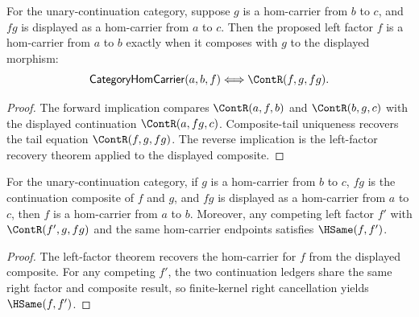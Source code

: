 \begin{theorem}
\label{thm:category-hom-carrier-comp-left-factor-iff}
For the unary-continuation category, suppose \(g\) is a hom-carrier from \(b\)
to \(c\), and \(fg\) is displayed as a hom-carrier from \(a\) to \(c\). Then
the proposed left factor \(f\) is a hom-carrier from \(a\) to \(b\) exactly
when it composes with \(g\) to the displayed morphism:
$$
\mathsf{CategoryHomCarrier}(a,b,f)
\Longleftrightarrow
\ContR(f,g,fg).
$$
\end{theorem}
\begin{proof}
The forward implication compares \(\ContR(a,f,b)\) and \(\ContR(b,g,c)\)
with the displayed continuation \(\ContR(a,fg,c)\). Composite-tail uniqueness
recovers the tail equation \(\ContR(f,g,fg)\). The reverse implication is the
left-factor recovery theorem applied to the displayed composite.
\end{proof}

\begin{theorem}
\label{thm:category-hom-carrier-comp-left-factor-public-readback}
For the unary-continuation category, if $g$ is a hom-carrier from $b$ to $c$,
$fg$ is the continuation composite of $f$ and $g$, and $fg$ is displayed as a
hom-carrier from $a$ to $c$, then $f$ is a hom-carrier from $a$ to $b$.
Moreover, any competing left factor $f'$ with $\ContR(f',g,fg)$ and the same
hom-carrier endpoints satisfies $\HSame(f,f')$.
\end{theorem}
\begin{proof}
The left-factor theorem recovers the hom-carrier for $f$ from the displayed
composite. For any competing $f'$, the two continuation ledgers share the same
right factor and composite result, so finite-kernel right cancellation yields
$\HSame(f,f')$.
\end{proof}

